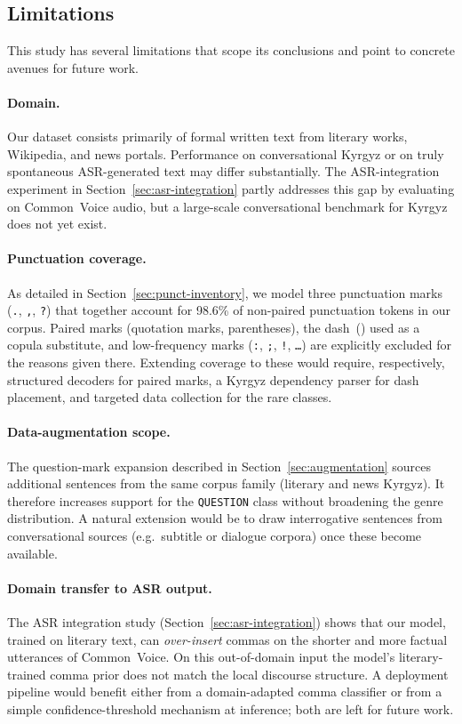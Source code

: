 \documentclass[manuscript, review]{acmart}
\begin{document}
\subsection{Limitations}
\label{sec:limitations}

This study has several limitations that scope its conclusions and point to concrete avenues for future work.

\paragraph{Domain.} Our dataset consists primarily of formal written text from literary works, Wikipedia, and news portals. Performance on conversational Kyrgyz or on truly spontaneous ASR-generated text may differ substantially. The ASR-integration experiment in Section~\ref{sec:asr-integration} partly addresses this gap by evaluating on Common~Voice audio, but a large-scale conversational benchmark for Kyrgyz does not yet exist.

\paragraph{Punctuation coverage.} As detailed in Section~\ref{sec:punct-inventory}, we model three punctuation marks (\texttt{.}, \texttt{,}, \texttt{?}) that together account for 98.6\% of non-paired punctuation tokens in our corpus. Paired marks (quotation marks, parentheses), the dash~(\textendash) used as a copula substitute, and low-frequency marks (\texttt{:}, \texttt{;}, \texttt{!}, \texttt{\ldots}) are explicitly excluded for the reasons given there. Extending coverage to these would require, respectively, structured decoders for paired marks, a Kyrgyz dependency parser for dash placement, and targeted data collection for the rare classes.

\paragraph{Data-augmentation scope.} The question-mark expansion described in Section~\ref{sec:augmentation} sources additional sentences from the same corpus family (literary and news Kyrgyz). It therefore increases support for the \texttt{QUESTION} class without broadening the genre distribution. A natural extension would be to draw interrogative sentences from conversational sources (e.g.\ subtitle or dialogue corpora) once these become available.

\paragraph{Domain transfer to ASR output.} The ASR integration study (Section~\ref{sec:asr-integration}) shows that our model, trained on literary text, can \emph{over-insert} commas on the shorter and more factual utterances of Common~Voice. On this out-of-domain input the model's literary-trained comma prior does not match the local discourse structure. A deployment pipeline would benefit either from a domain-adapted comma classifier or from a simple confidence-threshold mechanism at inference; both are left for future work.
\end{document}
